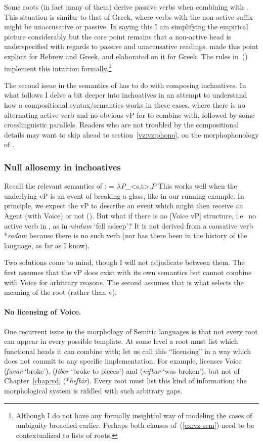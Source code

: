 Some roots (in fact many of them) derive passive verbs when combining with {\tnif}. This situation is similar to that of Greek, where verbs with the non-active suffix might be unaccusative or passive. In saying this I am simplifying the empirical picture considerably but the core point remains that a non-active head is underspecified with regards to passive and unaccusative readings. \cite{alexiadoudoron12} made this point explicit for Hebrew and Greek, and \cite{layering15} elaborated on it for Greek. The rules in~(\lastx) implement this intuition formally.\footnote{Although I do not have any formally insightful way of modeling the cases of ambiguity broached earlier. Perhaps both clauses of~(\ref{ex:vz-sem}) need to be contextualized to lists of roots.}

The second issue in the semantics of {\vz} has to do with composing inchoatives. In what follows I delve a bit deeper into inchoatives in an attempt to understand how a compositional syntax/semantics works in these cases, where there is no alternating active verb and no obvious vP for {\vz} to combine with, followed by some crosslinguistic parallels. Readers who are not troubled by the compositional details may want to skip ahead to section~\ref{vz:vz:phono}, on the morphophonology of {\vz}.

  		\subsubsection{Null allosemy in inchoatives} \label{vz:inch:analysis}
Recall the relevant semantics of {\vz}:
\ex \denote{\vz} = $\lambda P$_{<s,t>}$.P$
\xe
This works well when the underlying vP is an event of breaking a glass, like in our running example. In principle, we expect the vP to describe an event which might then receive an Agent (with Voice) or not ({\vz}). But what if there is no [Voice vP] structure, i.e.~no active verb in {\tkal}, as in \emph{nirdam} `fell asleep'? It is not derived from a causative verb *\emph{radam} because there is no such verb (nor has there been in the history of the language, as far as I know).

Two solutions come to mind, though I will not adjudicate between them. The first assumes that the vP does exist with its own semantics but cannot combine with Voice for arbitrary reasons. The second assumes that {\vz} is what selects the meaning of the root (rather than v).

\paragraph{No licensing of Voice.} One recurrent issue in the morphology of Semitic languages is that not every root can appear in every possible template. At some level a root must list which functional heads it can combine with; let us call this ``licensing'' in a way which does not commit to any specific implementation. For example,  licenses Voice (\emph{ʃavar} `broke'), {\va} (\emph{ʃiber} `broke to pieces') and {\vz} (\emph{niʃbar} `was broken'), but not {\vd} of Chapter~\ref{chap:vd} (*\emph{heʃbir}). Every root must list this kind of information; the morphological system is riddled with such arbitrary gaps.

